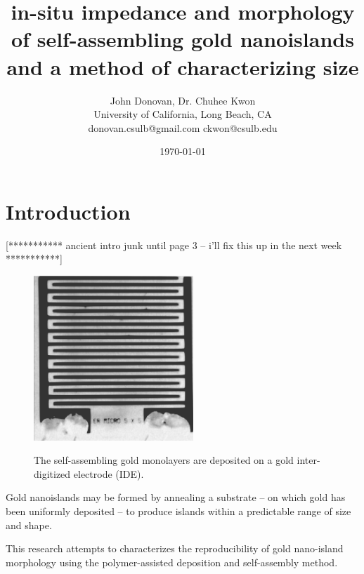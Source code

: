 \documentclass[12pt,oneside,english]{article}
\begin{document}

        \title{in-situ impedance and morphology of self-assembling gold nanoislands and a method of characterizing size}

    \author{John Donovan, Dr. Chuhee Kwon\\
    University of California, Long Beach, CA\\
    {\small donovan.csulb@gmail.com ckwon@csulb.edu}}
    
        \date{\today}

    \maketitle

    \tableofcontents
    \clearpage


    

    \section{Introduction}

[*********** ancient intro junk until page 3 -- i'll fix this up in the next week ***********]

    \begin{figure}
    \includegraphics[width=60mm]{images/IDE.eps} \label{f:IDE}
    \caption{The self-assembling gold monolayers are deposited on a gold inter-digitized electrode (IDE).}
    \end{figure}
    
    Gold nanoislands may be formed by annealing a substrate -- on which gold has been uniformly deposited -- to produce islands within a predictable range of size and shape.
    
    This research attempts to characterizes the reproducibility of gold nano-island morphology using the polymer-assisted deposition and self-assembly method.
    
\end{document}
